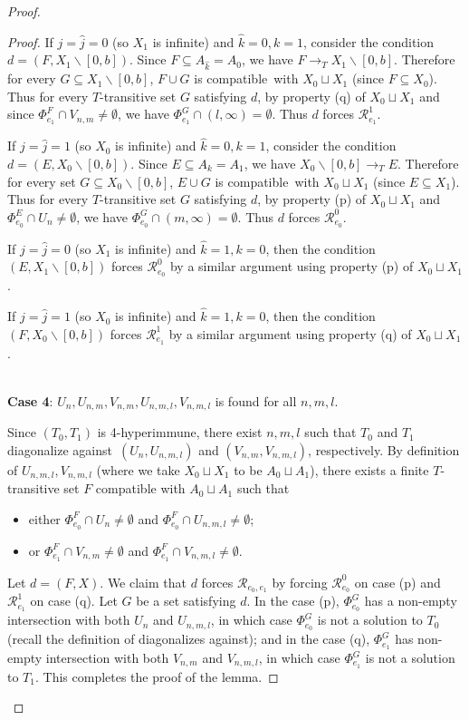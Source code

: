\documentclass{amsart}
\theoremstyle{definition}
\theoremstyle{remark}
\numberwithin{equation}{section}
\theoremstyle{noparens}
\def\mcal{\mathcal}
\renewcommand{\setminus}{\smallsetminus}
\def\r{\rightarrow}
\def\iatfshyp{4-hyperimmune}
\def\compatible{compatible}
\def\h{\hat}
\begin{document}
\begin{proof}
\begin{proof}
If $j=\h j=0$ (so $X_1$ is infinite) and $\h k=0, k=1$, consider the
condition $d= (F,X_1\setminus[0,b])$.
Since $F\subseteq A_{\h k}=A_0$,
 we have $F\r_T X_1\setminus [0,b]$.
 Therefore for every   $G\subseteq X_1\setminus [0,b]$,
 $F\cup G$ is \compatible\ with $X_0\sqcup X_1$ (since $F\subseteq X_0$).
 Thus for every $T$-transitive set $G$ satisfying $d$,
 by property (q) of $X_0\sqcup X_1$
 and since $\Phi_{e_1}^F\cap V_{n,m}\ne\emptyset$, we have $\Phi_{e_1}^{G}\cap (l,\infty)=\emptyset$.
Thus $d$ forces $\mcal{R}_{e_1}^1$.

If $j=\h j=1$ (so $X_0$ is infinite) and $\h k=0, k=1$, consider the condition $d=(E,X_0 \setminus[0,b])$.
Since $E\subseteq A_k=A_1 $,
we have $X_0\setminus[0,b]\r_T E$.
Therefore for every set $G\subseteq X_0\setminus[0,b]$,
$E\cup G$ is \compatible\ with $X_0\sqcup X_1$ (since $E\subseteq X_1$). Thus for every  $T$-transitive set $G$
satisfying $d$,
by property (p) of $X_0\sqcup X_1$ and $\Phi_{e_0}^E\cap U_n\ne\emptyset$, we have
$\Phi_{e_0}^G\cap (m,\infty)=\emptyset$.
Thus $d$ forces $\mcal{R}_{e_0}^0$.

If $j=\h j=0$ (so $X_1$ is infinite) and $\h k=1, k=0$,
then the condition $(E, X_1 \setminus [0, b])$ forces $\mcal{R}_{e_0}^0$ by a similar argument using property (p) of $X_0\sqcup X_1$.

If $j=\h j=1$ (so $X_0$ is infinite) and $\h k=1, k=0$,
then the condition $(F, X_0 \setminus [0, b])$ forces $\mcal{R}_{e_1}^1$ by a similar argument using property (q) of $X_0\sqcup X_1$.

 \ \\

\noindent
\textbf{Case 4}:  $U_n,U_{n,m},V_{n,m},U_{n,m,l},V_{n,m,l}$
  is found for all $n,m,l$.

Since $(T_0,T_1)$ is \iatfshyp, there exist
$n, m,l$ such that $T_0$ and $T_1$ diagonalize against\
$(U_{n},U_{n,m,l})$ and
$(V_{n, m},V_{n, m,l})$, respectively.
By definition of
$U_{n,m,l},V_{n,m,l}$ (where we take $X_0\sqcup X_1$ to be $A_0\sqcup A_1$),
there exists a finite $T$-transitive set $F $   compatible  with
$A_0\sqcup A_1$  such that
\begin{itemize}
    \item[(p)]  either
$\Phi_{e_0}^{F}\cap U_{n} \neq \emptyset$ and $\Phi_{e_0}^{F}\cap U_{n,m,l}\ne\emptyset$;
    \item[(q)] or
$\Phi_{e_1}^{F}\cap V_{n,m} \neq \emptyset$ and $\Phi_{e_1}^{F}\cap V_{n,m,l}\ne\emptyset$.
\end{itemize}
Let $d=(F,X)$. We claim that $d$ forces $\mcal{R}_{e_0,e_1}$ by forcing $\mcal{R}^0_{e_0}$ on case (p) and $\mcal{R}^1_{e_1}$ on case (q).
Let $G$ be a set satisfying $d$.
In the case (p), $\Phi_{e_0}^G$ has a non-empty intersection with both $U_{n}$ and $U_{n,m,l}$, in which case $\Phi_{e_0}^G$ is not a solution to $T_0$ (recall the definition of diagonalizes against); and in the case (q), $\Phi_{e_1}^G$ has non-empty intersection with both $V_{n,m}$ and $V_{n,m,l}$, in which case $\Phi_{e_1}^G$ is not a solution to $T_1$.
This completes the proof of the lemma.
\end{proof}



\end{proof}
\end{document}
